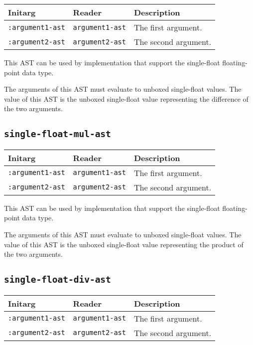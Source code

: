 \begin{tabular}{|l|l|l|}
\hline
Initarg & Reader & Description\\
\hline\hline
\texttt{:argument1-ast} & \texttt{argument1-ast} & The first argument.\\
\hline
\texttt{:argument2-ast} & \texttt{argument2-ast} & The second argument.\\
\hline
\end{tabular}

This AST can be used by implementation that support the single-float
floating-point data type.  

The arguments of this AST must evaluate to unboxed single-float
values.  The value of this AST is the unboxed single-float value
representing the difference of the two arguments.

\subsection{\texttt{single-float-mul-ast}}
\label{sec-ast-single-float-mul}

\begin{tabular}{|l|l|l|}
\hline
Initarg & Reader & Description\\
\hline\hline
\texttt{:argument1-ast} & \texttt{argument1-ast} & The first argument.\\
\hline
\texttt{:argument2-ast} & \texttt{argument2-ast} & The second argument.\\
\hline
\end{tabular}

This AST can be used by implementation that support the single-float
floating-point data type.  

The arguments of this AST must evaluate to unboxed single-float
values.  The value of this AST is the unboxed single-float value
representing the product of the two arguments.

\subsection{\texttt{single-float-div-ast}}
\label{sec-ast-single-float-div}

\begin{tabular}{|l|l|l|}
\hline
Initarg & Reader & Description\\
\hline\hline
\texttt{:argument1-ast} & \texttt{argument1-ast} & The first argument.\\
\hline
\texttt{:argument2-ast} & \texttt{argument2-ast} & The second argument.\\
\hline
\end{tabular}

